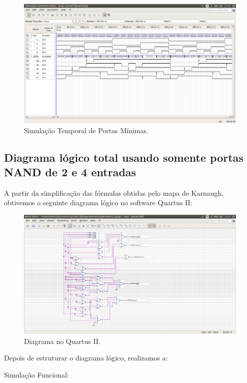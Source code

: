 \documentclass[12pt]{article}
\begin{document}
\begin{figure}[H]
	\centering
	\includegraphics[width=1\textwidth]{temporal1.png}
	\caption{Simulação Temporal de Portas Mínimas.}
	\label{fig:temporal1}
\end{figure}


\subsection{Diagrama lógico total usando somente portas NAND de 2 e 4 entradas}
\label{sec:nandporta}

A partir da simplificação das fórmulas obtidas pelo mapa de Karnaugh, obtivemos o seguinte diagrama lógico no software Quartus II:

\begin{figure}[H]
	\centering
	\includegraphics[width=1\textwidth]{nand.png}
	\caption{Diagrama no Quartus II.}
	\label{fig:diagrama2}
\end{figure}


Depois de estruturar o diagrama lógico, realizamos a: 

Simulação Funcional:
\end{document}
